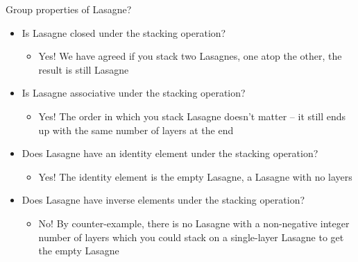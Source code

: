 \documentclass{beamer}
\begin{document}
\begin{frame}{Group properties of Lasagne?}
    \begin{itemize}
        \item<1-> Is Lasagne closed under the stacking operation?
        \begin{itemize}
            \item<2-> Yes! We have agreed if you stack two Lasagnes, one atop the other, the result is still Lasagne 
        \end{itemize}
        \item<3-> Is Lasagne associative under the stacking operation?
        \begin{itemize}
            \item<4-> Yes! The order in which you stack Lasagne doesn't matter -- it still ends up with the same number of layers at the end
        \end{itemize}
        \item<5-> Does Lasagne have an identity element under the stacking operation?
        \begin{itemize}
            \item<6-> Yes! The identity element is the empty Lasagne, a Lasagne with no layers
        \end{itemize}
        \item<7-> Does Lasagne have inverse elements under the stacking operation?
        \begin{itemize}
            \item<8-> No! By counter-example, there is no Lasagne with a non-negative integer number of layers which you could stack on a single-layer Lasagne to get the empty Lasagne
        \end{itemize}
    \end{itemize}
\end{frame}
\end{document}
